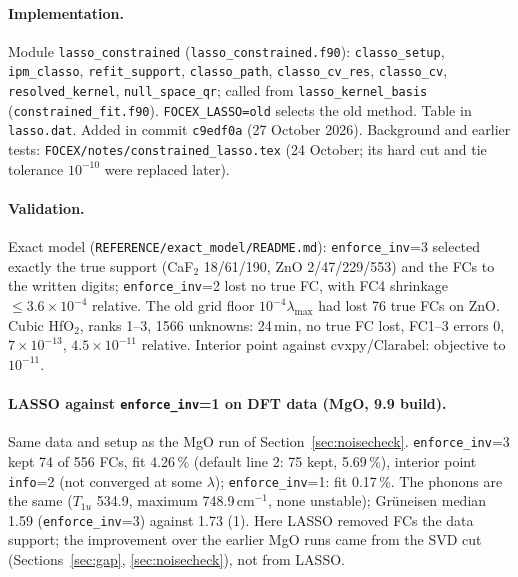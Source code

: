 \documentclass[11pt,a4paper]{article}
\newcommand{\code}[1]{\texttt{#1}}
\begin{document}
\paragraph{Implementation.} Module \code{lasso\_constrained} (\code{lasso\_constrained.f90}): \code{classo\_setup},
\code{ipm\_classo}, \code{refit\_support}, \code{classo\_path}, \code{classo\_cv\_res}, \code{classo\_cv},
\code{resolved\_kernel}, \code{null\_space\_qr}; called from \code{lasso\_kernel\_basis}
(\code{constrained\_fit.f90}). \code{FOCEX\_LASSO=old} selects the old method. Table in \code{lasso.dat}. Added
in commit \code{c9edf0a} (27 October 2026). Background and earlier tests:
\code{FOCEX/notes/constrained\_lasso.tex} (24 October; its hard cut and tie tolerance $10^{-10}$ were
replaced later).

\paragraph{Validation.} Exact model (\code{REFERENCE/exact\_model/README.md}): \code{enforce\_inv}=3 selected
exactly the true support (CaF$_2$ 18/61/190, ZnO 2/47/229/553) and the FCs to the written digits;
\code{enforce\_inv}=2 lost no true FC, with FC4 shrinkage $\le3.6\times10^{-4}$ relative. The old grid floor
$10^{-4}\lambda_{\max}$ had lost 76 true FCs on ZnO. Cubic HfO$_2$, ranks 1--3, 1566 unknowns: 24\,min, no true FC
lost, FC1--3 errors 0, $7\times10^{-13}$, $4.5\times10^{-11}$ relative. Interior point against cvxpy/Clarabel: objective
to $10^{-11}$.

\paragraph{LASSO against \code{enforce\_inv}=1 on DFT data (MgO, 9.9 build).} Same data and setup as the MgO run
of Section~\ref{sec:noisecheck}. \code{enforce\_inv}=3 kept 74 of 556 FCs, fit 4.26\,\% (default line 2: 75 kept,
5.69\,\%), interior point \code{info}=2 (not converged at some $\lambda$); \code{enforce\_inv}=1: fit 0.17\,\%. The
phonons are the same ($T_{1u}$ 534.9, maximum 748.9\,cm$^{-1}$, none unstable); Gr\"uneisen median 1.59
(\code{enforce\_inv}=3) against 1.73 (1). Here LASSO removed FCs the data support; the improvement over the
earlier MgO runs came from the SVD cut (Sections~\ref{sec:gap}, \ref{sec:noisecheck}), not from LASSO.
\end{document}
